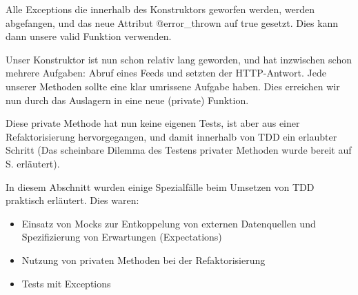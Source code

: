\tddgreen
Alle Exceptions die innerhalb des Konstruktors geworfen werden, werden abgefangen, und das neue Attribut @error\_thrown auf true gesetzt. Dies kann dann unsere valid Funktion verwenden.

\tddrefactor

Unser Konstruktor ist nun schon relativ lang geworden, und hat inzwischen schon mehrere Aufgaben: Abruf eines Feeds und setzten der HTTP-Antwort. Jede unserer Methoden sollte eine klar umrissene Aufgabe haben. Dies erreichen wir nun durch das Auslagern in eine neue (private) Funktion.

\begin{ruby}[label=lib/imported\_job.rb]
 
    
    
      
     
      
   
          

   
      
      
      
\end{ruby}

Diese private Methode hat nun keine eigenen Tests, ist aber aus einer Refaktorisierung hervorgegangen, und damit innerhalb von TDD ein erlaubter Schritt (Das scheinbare Dilemma des Testens privater Methoden wurde bereit auf S. \pageref{sec:tddspecialcircumstances} erläutert).


In diesem Abschnitt wurden einige Spezialfälle beim Umsetzen von TDD praktisch erläutert. Dies waren:
\begin{itemize}
 \item Einsatz von Mocks zur Entkoppelung von externen Datenquellen und Spezifizierung von Erwartungen (Expectations)
 \item Nutzung von privaten Methoden bei der Refaktorisierung
 \item Tests mit Exceptions
\end{itemize}

